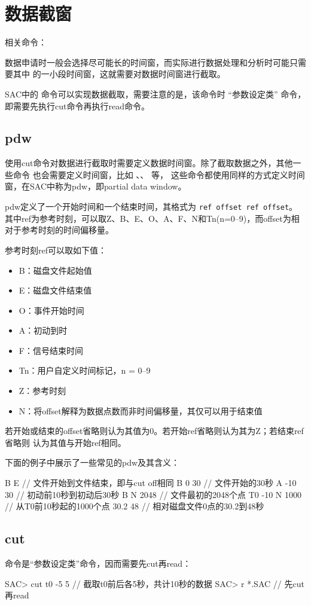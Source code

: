 \section{数据截窗}
相关命令：

数据申请时一般会选择尽可能长的时间窗，而实际进行数据处理和分析时可能只需要其中
的一小段时间窗，这就需要对数据时间窗进行截取。

SAC中的  命令可以实现数据截取，需要注意的是，该命令时
``参数设定类'' 命令，即需要先执行cut命令再执行read命令。

\subsection{pdw}
\label{subsec:pdw}
使用cut命令对数据进行截取时需要定义数据时间窗。除了截取数据之外，其他一些命令
也会需要定义时间窗，比如 、、 等，
这些命令都使用同样的方式定义时间窗，在SAC中称为pdw，即partial data window。

pdw定义了一个开始时间和一个结束时间，其格式为 \texttt{ref offset ref offset}。
其中ref为参考时刻，可以取Z、B、E、O、A、F、N和Tn(n=0--9)，而offset为相对于参考时刻的时间偏移量。

参考时刻ref可以取如下值：
\begin{itemize}
\item B：磁盘文件起始值
\item E：磁盘文件结束值
\item O：事件开始时间
\item A：初动到时
\item F：信号结束时间
\item Tn：用户自定义时间标记，n = 0--9
\item Z：参考时刻
\item N：将offset解释为数据点数而非时间偏移量，其仅可以用于结束值
\end{itemize}

若开始或结束的offset省略则认为其值为0。若开始ref省略则认为其为Z；若结束ref省略则
认为其值与开始ref相同。

下面的例子中展示了一些常见的pdw及其含义：
\begin{SACCode}
 B E            // 文件开始到文件结束，即与cut off相同
 B 0 30         // 文件开始的30秒
 A -10 30       // 初动前10秒到初动后30秒
 B N 2048       // 文件最初的2048个点
 T0 -10 N 1000  // 从T0前10秒起的1000个点
 30.2 48        // 相对磁盘文件0点的30.2到48秒
\end{SACCode}

\subsection{cut}
 命令是``参数设定类''命令，因而需要先cut再read：
\begin{SACCode}
SAC> cut t0 -5 5        // 截取t0前后各5秒，共计10秒的数据
SAC> r *.SAC            // 先cut再read
\end{SACCode}
